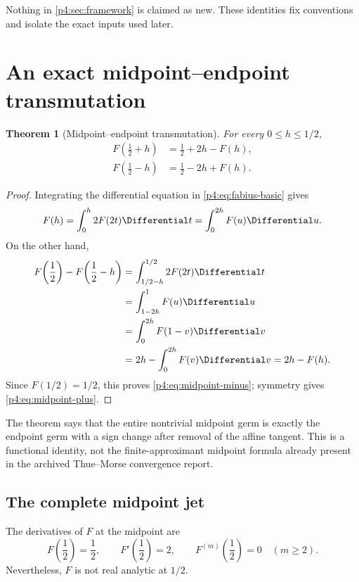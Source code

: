 \documentclass[11pt]{article}
\numberwithin{equation}{section}
\newtheorem{theorem}{Theorem}[section]
\theoremstyle{definition}
\theoremstyle{remark}
\begin{document}
\begin{establishedinputbox}
Nothing in \cref{p4:sec:framework} is claimed as new.  These identities fix conventions and isolate the exact inputs used later.
\end{establishedinputbox}

\section{An exact midpoint--endpoint transmutation}
\label{p4:sec:midpoint}

\begin{theorem}[Midpoint--endpoint transmutation]
\label{p4:thm:midpoint-transmutation}
For every $0\le h\le1/2$,
\begin{align}
 F\!\left(\frac12+h\right)&=\frac12+2h-F(h),
 \label{p4:eq:midpoint-plus}\\
 F\!\left(\frac12-h\right)&=\frac12-2h+F(h).
 \label{p4:eq:midpoint-minus}
\end{align}
\end{theorem}

\begin{proof}
Integrating the differential equation in \eqref{p4:eq:fabius-basic} gives
\begin{equation}
 F(h)=\int_0^h2F(2t)\Differential t=\int_0^{2h}F(u)\Differential u.
 \label{p4:eq:F-integral}
\end{equation}
On the other hand,
\begin{align*}
 F\!\left(\frac12\right)-F\!\left(\frac12-h\right)
 &=\int_{1/2-h}^{1/2}2F(2t)\Differential t\\
 &=\int_{1-2h}^{1}F(u)\Differential u\\
 &=\int_0^{2h}F(1-v)\Differential v\\
 &=2h-\int_0^{2h}F(v)\Differential v
 =2h-F(h).
\end{align*}
Since $F(1/2)=1/2$, this proves \eqref{p4:eq:midpoint-minus}; symmetry gives \eqref{p4:eq:midpoint-plus}.
\end{proof}

\begin{corpusdeductionbox}
The theorem says that the entire nontrivial midpoint germ is exactly the endpoint germ with a sign change after removal of the affine tangent.  This is a functional identity, not the finite-approximant midpoint formula already present in the archived Thue--Morse convergence report.
\end{corpusdeductionbox}

\subsection{The complete midpoint jet}
\begin{corollary}
\label{p4:cor:midpoint-jet}
The derivatives of $F$ at the midpoint are
\begin{equation}
 F\!\left(\frac12\right)=\frac12,
 \qquad F'\!\left(\frac12\right)=2,
 \qquad F^{(m)}\!\left(\frac12\right)=0\quad(m\ge2).
 \label{p4:eq:midpoint-jet}
\end{equation}
Nevertheless, $F$ is not real analytic at $1/2$.
\end{corollary}
\end{document}
